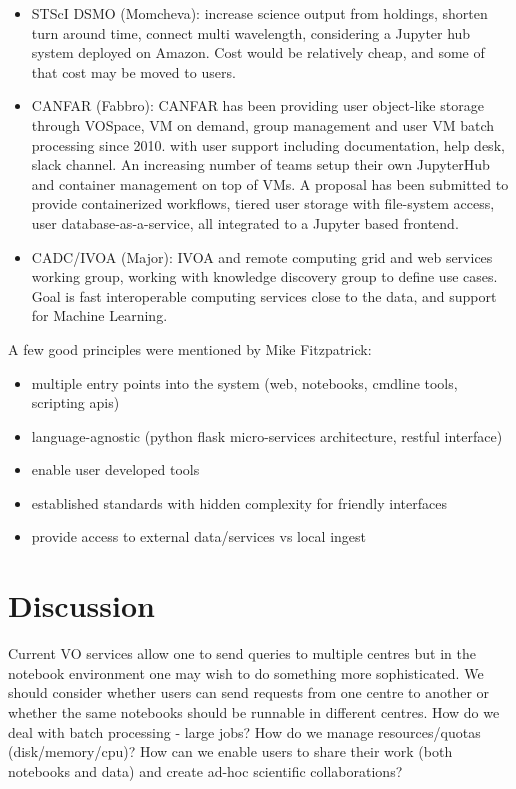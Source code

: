 \documentclass[11pt,twoside]{article}
\begin{document}
\begin{itemize}
\item STScI DSMO (Momcheva): increase science output from holdings, shorten turn around time, connect multi wavelength, considering a Jupyter hub system deployed on Amazon. Cost would be relatively cheap, and some of that cost may be moved to users.

\item CANFAR (Fabbro): CANFAR has been providing user object-like storage through VOSpace, VM on demand, group management and user VM batch processing since 2010. with user support including documentation, help desk, slack channel. An increasing number of teams setup their own JupyterHub and container management on top of VMs. A proposal has been submitted to provide containerized workflows, tiered user storage with file-system access, user database-as-a-service, all integrated to a Jupyter based frontend.

\item CADC/IVOA (Major): IVOA and remote computing grid and web services working group, working with knowledge discovery group to define use cases.
Goal is fast interoperable computing services close to the data, and support for Machine Learning.
\end{itemize}

A few good principles were mentioned by Mike Fitzpatrick:
\begin{itemize}
\item multiple entry points into the system (web, notebooks, cmdline tools, scripting apis)
\item language-agnostic (python flask micro-services architecture, restful interface)
\item  enable user developed tools
\item  established standards with hidden complexity for friendly interfaces
\item  provide access to external data/services vs local ingest
\end{itemize}


\section{Discussion}
Current VO services allow one to send queries to multiple centres but in the notebook environment one may wish to do something more sophisticated. We should consider whether users can send requests from one centre to another or whether the same notebooks should be runnable in different centres.
How do we deal with batch processing - large jobs? How do we manage resources/quotas (disk/memory/cpu)?  How can we enable users to share their work (both notebooks and data) and create ad-hoc scientific collaborations?
\end{document}
